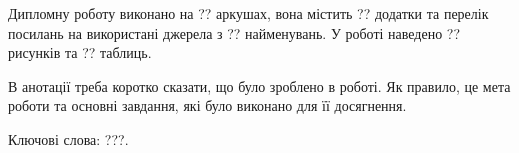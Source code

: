 
\abstractUkr

Дипломну роботу виконано на ?? аркушах, вона містить ?? додатки та перелік посилань на використані джерела з ?? найменувань. У роботі наведено ?? рисунків та ?? таблиць.

В анотації треба коротко сказати, що було зроблено в роботі. Як правило, це мета роботи та основні завдання, які було виконано для її досягнення. 


Ключові слова: ???.

\abstractEng



\clearpage